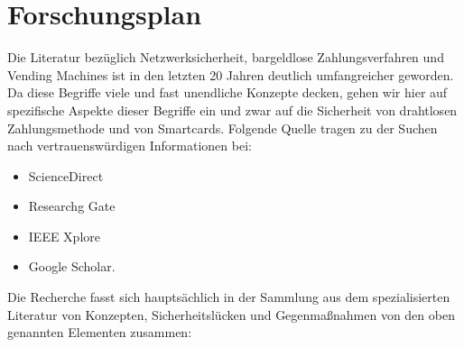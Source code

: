 \section{Forschungsplan}

Die Literatur bezüglich Netzwerksicherheit, bargeldlose Zahlungsverfahren und Vending Machines ist 
in den letzten 20 Jahren deutlich umfangreicher geworden. Da diese Begriffe viele und fast unendliche 
Konzepte decken, gehen wir hier auf spezifische Aspekte dieser Begriffe ein und zwar 
auf die Sicherheit von drahtlosen Zahlungsmethode und von Smartcards. Folgende Quelle tragen zu der
Suchen nach vertrauenswürdigen Informationen bei:

\begin{itemize}
    \item ScienceDirect
    \item Researchg Gate
    \item IEEE Xplore
    \item Google Scholar.
\end{itemize}

Die Recherche fasst sich hauptsächlich in der Sammlung aus dem spezialisierten Literatur von Konzepten,
Sicherheitslücken und Gegenmaßnahmen von den oben genannten Elementen zusammen:






